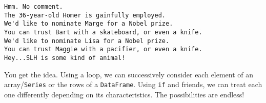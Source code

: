 \begin{Verbatim}[fontsize=\small,samepage=true,frame=leftline,framesep=5mm,framerule=1mm]
Hmm. No comment.
The 36-year-old Homer is gainfully employed.
We'd like to nominate Marge for a Nobel prize.
You can trust Bart with a skateboard, or even a knife.
We'd like to nominate Lisa for a Nobel prize.
You can trust Maggie with a pacifier, or even a knife.
Hey...SLH is some kind of animal!
\end{Verbatim}

You get the idea. Using a loop, we can successively consider each element of an
array/\texttt{Series} or the rows of a \texttt{DataFrame}. Using \texttt{if}
and friends, we can treat each one differently depending on its
characteristics. The possibilities are endless!
